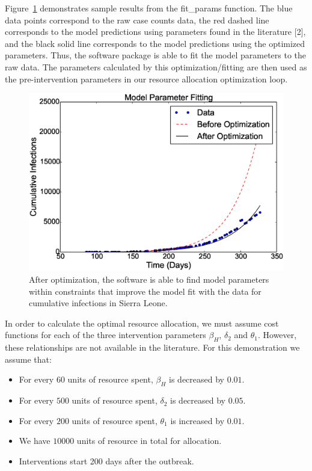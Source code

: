 \documentclass[11pt,letter]{article}
\begin{document}
Figure~\ref{model_fit} demonstrates sample results from the fit\_params function. The blue data points correspond to the raw case counts data, the red dashed line corresponds to the model predictions using parameters found in the literature [2], and the black solid line corresponds to the model predictions using the optimized parameters. Thus, the software package is able to fit the model parameters to the raw data. The parameters calculated by this optimization/fitting are then used as the pre-intervention parameters in our resource allocation optimization loop.\\
\begin{figure}
	\centering
	\includegraphics[width = 5.5 in]{model_fit.eps}
\caption{After optimization, the software is able to find model parameters within constraints that improve the model fit with the data for cumulative infections in Sierra Leone.
	\label{model_fit}}
\end{figure}

In order to calculate the optimal resource allocation, we must assume cost functions for each of the three intervention parameters $\beta_H$, $\delta_2$ and $\theta_1$. However, these relationships are not available in the literature. For this demonstration we assume that:
\begin{itemize}
\item For every $60$ units of resource spent, $\beta_H$ is decreased by $0.01$.
\item For every $500$ units of resource spent, $\delta_2$ is decreased by $0.05$.
\item For every $200$ units of resource spent, $\theta_1$ is increased by $0.01$.
\item We have $10000$ units of resource in total for allocation.
\item Interventions start 200 days after the outbreak.
\end{itemize}
\end{document}
